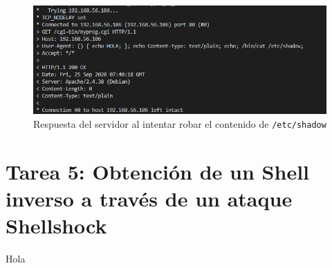 \documentclass[10pt,a4paper]{article}
\begin{document}
\begin{figure}[h!]
\centering
\includegraphics[scale=0.5]{images/Tarea_4c.png}
\caption{Respuesta del servidor al intentar robar el contenido de \texttt{/etc/shadow}}
\label{fig:tarea4_c} 
\end{figure}

\section{Tarea 5: Obtención de un Shell inverso a través de un ataque Shellshock}

Hola
\end{document}
